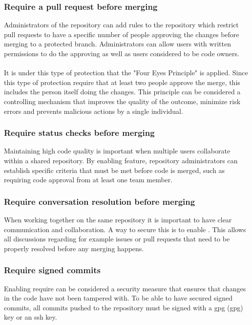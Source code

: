 \subsubsection{Require a pull request before merging}
Administrators of the repository can add rules to the repository which restrict pull requests to have a specific number of people approving the changes before merging to a protected branch. Administrators can allow users with written permissions to do the approving as well as users considered to be code owners. 
\\~\\
It is under this type of protection that the "Four Eyes Principle" is applied. Since this type of protection require that at least two people approve the merge, this includes the person itself doing the changes. This principle can be considered a controlling mechanism that improves the quality of the outcome, minimize risk errors and prevents malicious actions by a single individual. 

\subsubsection{Require status checks before merging}
Maintaining high code quality is important when multiple users collaborate within a shared repository. 
By enabling  feature, repository administrators can establish specific criteria that must be met before code is merged, such as requiring code approval from at least one team member.

\subsubsection{Require conversation resolution before merging}
When working together on the same repository it is important to have clear communication and collaboration. A way to secure this is to enable . This allows all discussions regarding for example issues or pull requests that need to be properly resolved before any merging happens. 

\subsubsection{Require signed commits}
Enabling require  can be considered a security measure that ensures that changes in the code have not been tampered with. 
To be able to have secured signed commits, all commits pushed to the repository must be signed with a \acrlong{gpg} (\acrshort{gpg}) key or an \acrshort{ssh} key. 


